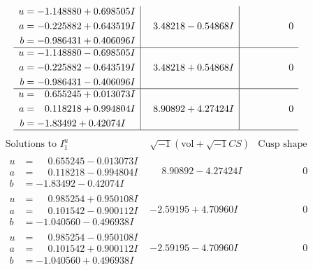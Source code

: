 \documentclass[1p]{elsarticle_modified}
\theoremstyle{definition}
\newcommand{\I}{\sqrt{-1}}
\begin{document}
$$\begin{array}{c|c|c}
\begin{aligned}
u &= -1.148880 + 0.698505 I \\
a &= -0.225882 + 0.643519 I \\
b &= -0.986431 + 0.406096 I\end{aligned}
 & \phantom{-}3.48218 - 0.54868 I & \phantom{-0.000000 } 0 \\ \hline\begin{aligned}
u &= -1.148880 - 0.698505 I \\
a &= -0.225882 - 0.643519 I \\
b &= -0.986431 - 0.406096 I\end{aligned}
 & \phantom{-}3.48218 + 0.54868 I & \phantom{-0.000000 } 0 \\ \hline\begin{aligned}
u &= \phantom{-}0.655245 + 0.013073 I \\
a &= \phantom{-}0.118218 + 0.994804 I \\
b &= -1.83492 + 0.42074 I\end{aligned}
 & \phantom{-}8.90892 + 4.27424 I & \phantom{-0.000000 } 0\\
 \hline 
 \end{array}$$\newpage$$\begin{array}{c|c|c}  
\text{Solutions to }I^u_{1}& \I (\text{vol} + \sqrt{-1}CS) & \text{Cusp shape}\\
 \hline 
\begin{aligned}
u &= \phantom{-}0.655245 - 0.013073 I \\
a &= \phantom{-}0.118218 - 0.994804 I \\
b &= -1.83492 - 0.42074 I\end{aligned}
 & \phantom{-}8.90892 - 4.27424 I & \phantom{-0.000000 } 0 \\ \hline\begin{aligned}
u &= \phantom{-}0.985254 + 0.950108 I \\
a &= \phantom{-}0.101542 - 0.900112 I \\
b &= -1.040560 - 0.496938 I\end{aligned}
 & -2.59195 + 4.70960 I & \phantom{-0.000000 } 0 \\ \hline\begin{aligned}
u &= \phantom{-}0.985254 - 0.950108 I \\
a &= \phantom{-}0.101542 + 0.900112 I \\
b &= -1.040560 + 0.496938 I\end{aligned}
 & -2.59195 - 4.70960 I & \phantom{-0.000000 } 0 \\ \hline\begin{aligned}

\end{aligned}
\end{array}$$
\end{document}

